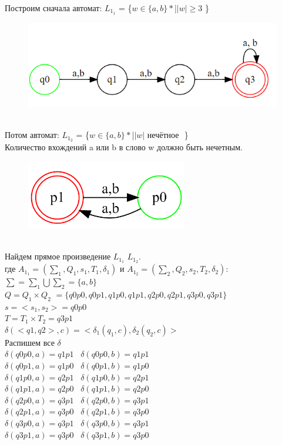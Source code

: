 \documentclass[a4paper]{article}
\begin{document}
\begin{enumerate}
Построим сначала автомат: 
$L_1_1$ = \{$ w \in \{a,b\}*   $|$  {|w|} \ge 3 $ \} \\
\begin{figure}[h]
\centering
\includegraphics[width=15cm]{Задание_№2_2_1.png}
\end{figure}
\\Потом автомат:
$L_1_2$ = \{$ w \in \{a,b\}*   $|$  {|w|} $ нечётное $ $ \} \\
Количество вхождений a или b в слово w должно быть нечетным.

\begin{figure}[h]
\centering
\includegraphics[width=7cm]{Задание_№2_2_2.png}
\end{figure}

\\Найдем прямое произведение $L_1_1$ \cap $L_1_2$.
\\где  $A_1_1 = (\sum_1 , Q_1, s_1, T_1, \delta_1) $ и  $A_1_2 = (\sum_2 , Q_2, s_2, T_2, \delta_2)$:\\
\hfill \break
$\sum = \sum_1 \bigcup \sum_2 = \{a, b\}$\\
$Q = Q_1 \times Q_2$ $= \{q0p0, q0p1, q1p0, q1p1, q2p0, q2p1, q3p0, q3p1 \}$\\
$s = <s_1, s_2> = q0p0$\\
$T = T_1 \times T_2 = q3p1$\\
$ \delta(<q1, q2>, c) = <\delta_1(q_1, c), \delta_2(q_2, c)>$\\ Распишем все $\delta$ \\
$\delta(q0p0, a) = q1p1$ \  $\delta(q0p0, b) = q1p1$ \\
$\delta(q0p1, a) = q1p0$ \  $\delta(q0p1, b) = q1p0$ \\
$\delta(q1p0, a) = q2p1$ \  $\delta(q1p0, b) = q2p1$ \\
$\delta(q1p1, a) = q2p0$ \  $\delta(q1p1, b) = q2p0$ \\
$\delta(q2p0, a) = q3p1$ \  $\delta(q2p0, b) = q3p1$ \\
$\delta(q2p1, a) = q3p0$ \  $\delta(q2p1, b) = q3p0$ \\
$\delta(q3p0, a) = q3p1$ \  $\delta(q3p0, b) = q3p1$ \\
$\delta(q3p1, a) = q3p0$ \  $\delta(q3p1, b) = q3p0$ \\


\end{enumerate}
\end{document}
